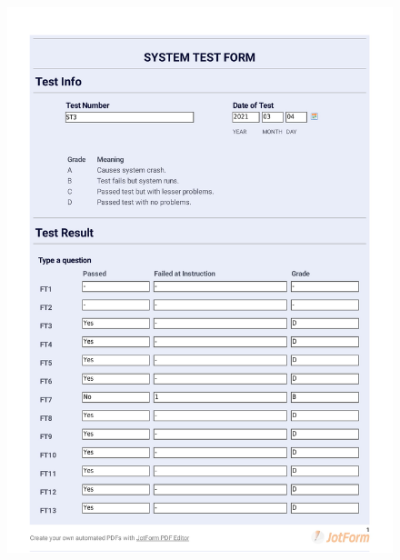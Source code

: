 \documentclass{article}
\begin{document}
\begin{figure}
     \centering
     \includegraphics[width=13cm]{images/2021-03-04_Anas_ST3-1}
     \renewcommand\figurename{Figure}
     \label{fig:my_label}
 \end{figure}
 
\end{document}
